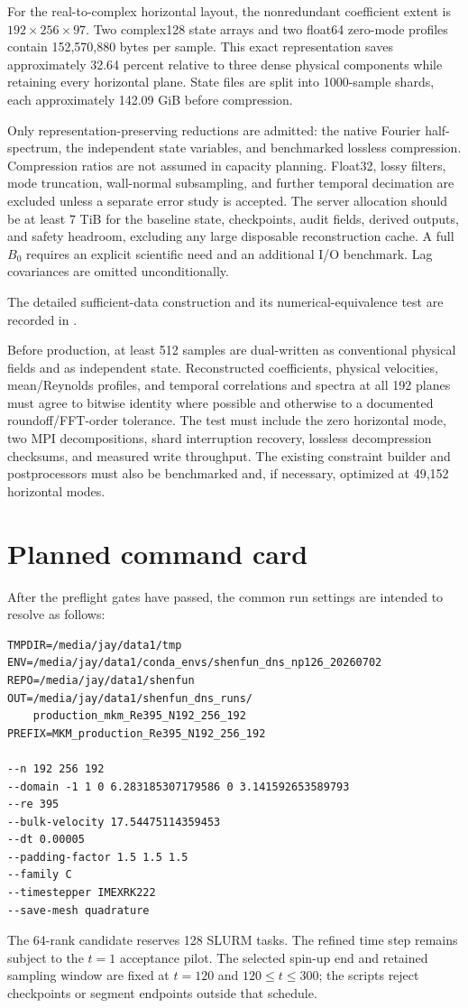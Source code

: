 \documentclass[11pt]{article}
\begin{document}
For the real-to-complex horizontal layout, the nonredundant coefficient extent
is $192\times256\times97$.  Two complex128 state arrays and two float64
zero-mode profiles contain 152,570,880 bytes per sample.  This exact
representation saves approximately 32.64 percent relative to three dense
physical components while retaining every horizontal plane.  State files are
split into 1000-sample shards, each approximately 142.09 GiB before
compression.

Only representation-preserving reductions are admitted: the native Fourier
half-spectrum, the independent state variables, and benchmarked lossless
compression.  Compression ratios are not assumed in capacity planning.
Float32, lossy filters, mode truncation, wall-normal subsampling, and further
temporal decimation are excluded unless a separate error study is accepted.
The server allocation should be at least 7 TiB for the baseline state,
checkpoints, audit fields, derived outputs, and safety headroom, excluding any
large disposable reconstruction cache.  A full $B_0$ requires an explicit
scientific need and an additional I/O benchmark.  Lag covariances are omitted
unconditionally.

The detailed sufficient-data construction and its numerical-equivalence test
are recorded in
.

Before production, at least 512 samples are dual-written as conventional
physical fields and as independent state.  Reconstructed coefficients,
physical velocities, mean/Reynolds profiles, and temporal correlations and
spectra at all 192 planes must agree to bitwise identity where possible and
otherwise to a documented roundoff/FFT-order tolerance.  The test must include
the zero horizontal mode, two MPI decompositions, shard interruption recovery,
lossless decompression checksums, and measured write throughput.  The existing
constraint builder and postprocessors must also be benchmarked and, if
necessary, optimized at 49,152 horizontal modes.

\section{Planned command card}

After the preflight gates have passed, the common run settings are intended to
resolve as follows:
\begin{verbatim}
TMPDIR=/media/jay/data1/tmp
ENV=/media/jay/data1/conda_envs/shenfun_dns_np126_20260702
REPO=/media/jay/data1/shenfun
OUT=/media/jay/data1/shenfun_dns_runs/
    production_mkm_Re395_N192_256_192
PREFIX=MKM_production_Re395_N192_256_192

--n 192 256 192
--domain -1 1 0 6.283185307179586 0 3.141592653589793
--re 395
--bulk-velocity 17.54475114359453
--dt 0.00005
--padding-factor 1.5 1.5 1.5
--family C
--timestepper IMEXRK222
--save-mesh quadrature
\end{verbatim}
The 64-rank candidate reserves 128 SLURM tasks.  The refined time step remains
subject to the $t=1$ acceptance pilot.  The selected spin-up end and retained
sampling window are fixed at $t=120$ and $120\le t\le300$; the scripts reject
checkpoints or segment endpoints outside that schedule.
\end{document}
